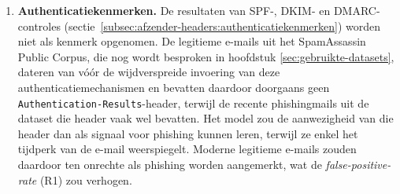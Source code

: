 \begin{enumerate}
    \item \textbf{Authenticatiekenmerken.} De resultaten van SPF-, DKIM- en DMARC-controles (sectie~\ref{subsec:afzender-headers:authenticatiekenmerken}) worden niet als kenmerk opgenomen. De legitieme e-mails uit het SpamAssassin Public Corpus, die nog wordt besproken in hoofdstuk \ref{sec:gebruikte-datasets}, dateren van vóór de wijdverspreide invoering van deze authenticatiemechanismen en bevatten daardoor doorgaans geen \texttt{Authentication-Results}-header, terwijl de recente phishingmails uit de dataset die header vaak wel bevatten. Het model zou de aanwezigheid van die header dan als signaal voor phishing kunnen leren, terwijl ze enkel het tijdperk van de e-mail weerspiegelt. Moderne legitieme e-mails zouden daardoor ten onrechte als phishing worden aangemerkt, wat de \emph{false-positive-rate} (R1) zou verhogen.
\end{enumerate}